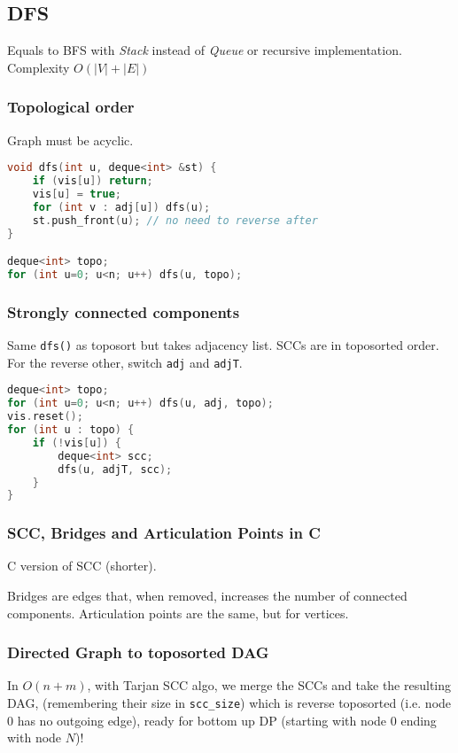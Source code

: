 \subsection{DFS}
Equals to BFS with \textit{Stack} instead of \textit{Queue} or recursive implementation. Complexity $O(|V|+|E|)$



\subsubsection{Topological order}
Graph must be acyclic.
\begin{lstlisting}[language=C++]
void dfs(int u, deque<int> &st) {
    if (vis[u]) return;
    vis[u] = true;
    for (int v : adj[u]) dfs(u);
    st.push_front(u); // no need to reverse after
}

deque<int> topo;
for (int u=0; u<n; u++) dfs(u, topo);
\end{lstlisting}

\subsubsection{Strongly connected components}
Same \lstinline|dfs()| as toposort but takes adjacency list. 
SCCs are in toposorted order. For the reverse other, switch \lstinline|adj| and \lstinline|adjT|.
\begin{lstlisting}[language=C++]
deque<int> topo;
for (int u=0; u<n; u++) dfs(u, adj, topo);
vis.reset();
for (int u : topo) {
    if (!vis[u]) {
        deque<int> scc;
        dfs(u, adjT, scc);
    }
}
\end{lstlisting}

\subsubsection{SCC, Bridges and Articulation Points in C}
C version of SCC (shorter).


Bridges are edges that, when removed, increases the number of connected components. Articulation points are the same, but for vertices.


\subsubsection{Directed Graph to toposorted DAG}
In $O(n + m)$, with Tarjan SCC algo,
we merge the SCCs and take the resulting DAG,
(remembering their size in \lstinline|scc_size|)
which is reverse toposorted (i.e. node 0 has no outgoing edge),
ready for bottom up DP (starting with node 0 ending with node $N$)!

